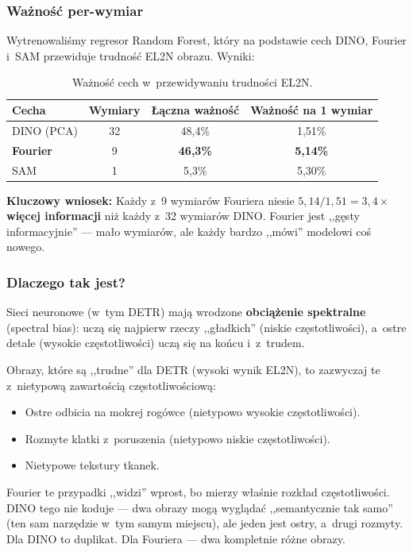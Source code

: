\subsubsection{Ważność per-wymiar}

Wytrenowaliśmy regresor Random Forest, który na podstawie cech DINO,
Fourier i~SAM przewiduje trudność EL2N obrazu.  Wyniki:

\begin{table}[h]
\centering
\caption{Ważność cech w~przewidywaniu trudności EL2N.}
\label{tab:importance_simple}
\begin{tabular}{lccc}
\toprule
\textbf{Cecha} & \textbf{Wymiary} & \textbf{Łączna ważność} &
    \textbf{Ważność na 1 wymiar} \\
\midrule
DINO (PCA)       & 32 & 48{,}4\% & 1{,}51\% \\
\textbf{Fourier} &  9 & \textbf{46{,}3\%} & \textbf{5{,}14\%} \\
SAM              &  1 &  5{,}3\% & 5{,}30\% \\
\bottomrule
\end{tabular}
\end{table}

\textbf{Kluczowy wniosek:} Każdy z~9 wymiarów Fouriera niesie
$5{,}14 / 1{,}51 = 3{,}4\times$ \textbf{więcej informacji} niż każdy z~32
wymiarów DINO.  Fourier jest ,,gęsty informacyjnie'' --- mało wymiarów, ale
każdy bardzo ,,mówi'' modelowi coś nowego.

\subsubsection{Dlaczego tak jest?}

Sieci neuronowe (w~tym DETR) mają wrodzone \textbf{obciążenie spektralne}
(spectral bias): uczą się najpierw rzeczy ,,gładkich'' (niskie
częstotliwości), a~ostre detale (wysokie częstotliwości) uczą się na końcu
i~z~trudem.

Obrazy, które są ,,trudne'' dla DETR (wysoki wynik EL2N), to zazwyczaj te
z~nietypową zawartością częstotliwościową:
\begin{itemize}
    \item Ostre odbicia na mokrej rogówce (nietypowo wysokie częstotliwości).
    \item Rozmyte klatki z~poruszenia (nietypowo niskie częstotliwości).
    \item Nietypowe tekstury tkanek.
\end{itemize}

Fourier te przypadki ,,widzi'' wprost, bo mierzy właśnie rozkład
częstotliwości.  DINO tego nie koduje --- dwa obrazy mogą wyglądać
,,semantycznie tak samo'' (ten sam narzędzie w~tym samym miejscu), ale jeden
jest ostry, a~drugi rozmyty.  Dla DINO to duplikat.  Dla Fouriera --- dwa
kompletnie różne obrazy.


